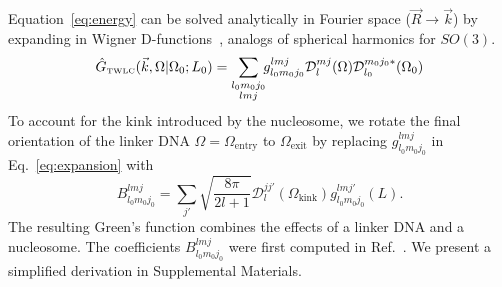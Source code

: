 \documentclass[%
 reprint,
superscriptaddress,
showpacs,preprintnumbers,
 amsmath,amssymb,
 aps,
 prl,
]{revtex4-1}
\newcommand{\ghat}[2][\Omega_0; L_0]{\hat{G}_\text{\tiny TWLC}(#2|#1)}
\newcommand{\wigD}{\mathcal{D}}
\begin{document}
Equation~\ref{eq:energy} can be solved analytically in Fourier space
    ($\vec{R} \rightarrow \vec{k}$) by expanding in Wigner
    D-functions~\cite{spakowitz2006}, analogs of spherical harmonics for
    $SO(3)$.
\begin{gather}\label{eq:expansion}
    \ghat{\vec{k}, \Omega} = \sum_{\substack{ l_0 m_0 j_0 \\ l m j}} \!\! g_{l_0 m_0 j_0}^{lmj}
        \wigD_{l}^{mj}(\Omega)\wigD_{l_0}^{m_0 j_0 *}(\Omega_0)
\raisetag{1\baselineskip}
\end{gather}
To account for the kink introduced by the nucleosome, we rotate
    the final orientation of the linker DNA ${\Omega = \Omega_\text{entry}}$ to
    $\Omega_\text{exit}$ by replacing
    $g_{l_0 m_0 j_0}^{lmj}$ in Eq.~\ref{eq:expansion} with
    \begin{equation}\label{eq:coeffs}
        B_{l_{0}m_{0}j_{0}}^{lmj} = %
        \sum_{j'}
        \sqrt{\frac{8\pi}{2l+1}}
        \mathcal{D}_{l}^{jj'}\!\!\left(\Omega_\text{kink}\right)g_{l_{0}m_{0}j_{0}}^{lmj'}\!\left(L\right).
    \end{equation}
The resulting Green's function combines the effects of a linker DNA and a nucleosome.
The coefficients $B_{l_0 m_0 j_0}^{lmj}$ were first computed in Ref.~\cite{zhou2003}.
We present a simplified derivation in Supplemental Materials.
\end{document}
